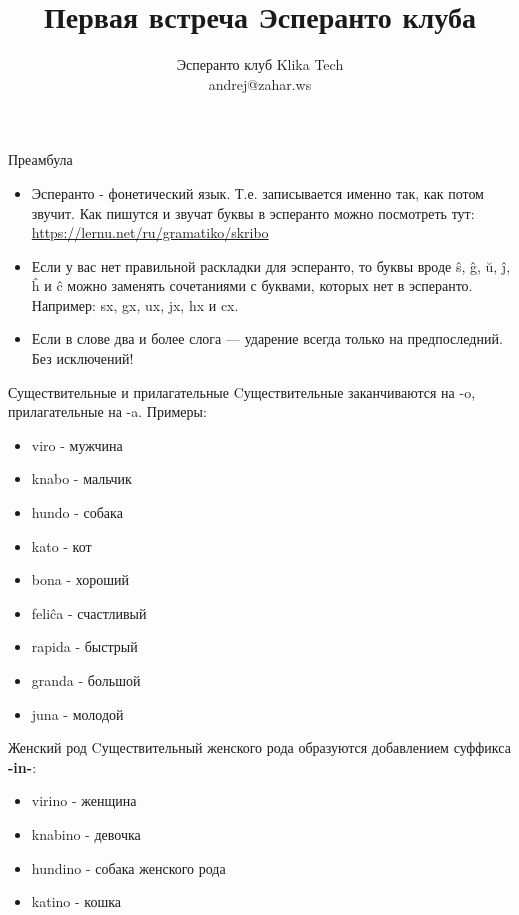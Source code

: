 \documentclass[ignorenonframetext,hyperref={pdftex,unicode}]{beamer}
\title{Первая встреча Эсперанто клуба}
\author[Эсперанто клуб Klika Tech]{Эсперанто клуб Klika Tech\\ andrej@zahar.ws}
\begin{document}
\frame{\titlepage}

\begin{frame}{Преамбула}
    \begin{itemize}
	    \item Эсперанто - фонетический язык. Т.е. записывается именно так, как потом звучит. Как пишутся и звучат буквы в эсперанто можно посмотреть тут: \href{https://lernu.net/ru/gramatiko/skribo}{https://lernu.net/ru/gramatiko/skribo}
        \item Если у вас нет правильной раскладки для эсперанто, то буквы вроде ŝ, ĝ, ŭ, ĵ, ĥ и ĉ можно заменять сочетаниями с буквами, которых нет в эсперанто. Например: sx, gx, ux, jx, hx и cx.
        \item Если в слове два и более слога — ударение всегда только на предпоследний. Без исключений!
    \end{itemize}
\end{frame}

\begin{frame}{Существительные и прилагательные}
    Cуществительные заканчиваются на -o, прилагательные на -a. Примеры:
    \begin{itemize}
        \item viro - мужчина
        \item knabo - мальчик
        \item hundo - собака
        \item kato - кот
    \end{itemize}
    \begin{itemize}
        \item bona - хороший
        \item feliĉa - счастливый
        \item rapida - быстрый
        \item granda - большой
        \item juna - молодой
    \end{itemize}
\end{frame}

\begin{frame}{Женский род}
    Cуществительный женского рода образуются добавлением суффикса \textbf{-in-}:
    \begin{itemize}
        \item virino - женщина
        \item knabino - девочка
        \item hundino - собака женского рода
        \item katino - кошка
    \end{itemize}
\end{frame}
\end{document}
